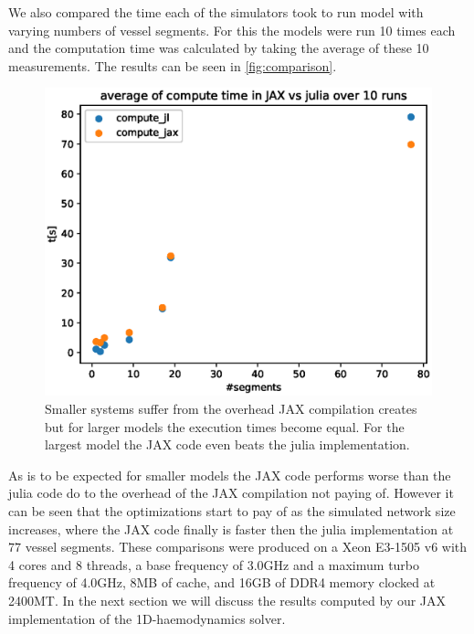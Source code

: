 \documentclass[a4paper, oneside]{discothesis}
\begin{document}
We also compared the time each of the simulators took to run model with varying numbers of vessel segments.
For this the models were run 10 times each and the computation time was calculated by taking the average of these 10 measurements.
The results can be seen in \autoref{fig:comparison}.
\begin{figure} [H]
	\centering
	\includegraphics[width=0.8\columnwidth]{figures/comparison.eps}
	\caption{Smaller systems suffer from the overhead JAX compilation creates but for larger models the execution times become equal. For the largest model the JAX code even beats the julia implementation.}
	\label{fig:comparison}
\end{figure}
As is to be expected for smaller models the JAX code performs worse than the julia code do to the overhead of the JAX compilation not paying of.
However it can be seen that the optimizations start to pay of as the simulated network size increases, where the JAX code finally is faster then the julia implementation at $77$ vessel segments.
These comparisons were produced on a Xeon E3-1505 v6 with 4 cores and 8 threads, a base frequency of 3.0GHz and a maximum turbo frequency of 4.0GHz, 8MB of cache, and 16GB of DDR4 memory clocked at 2400MT.
In the next section we will discuss the results computed by our JAX implementation of the 1D-haemodynamics solver.
\end{document}
